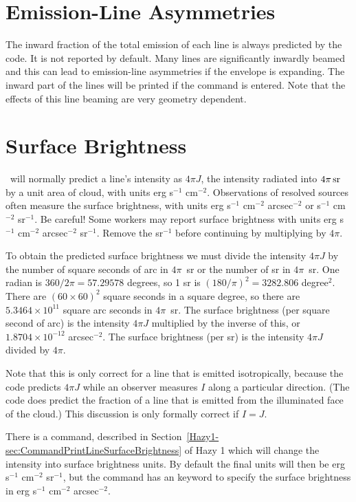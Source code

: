 \section{Emission-Line Asymmetries}

The inward fraction of the total emission of each line is always predicted
by the code.
It is not reported by default.
Many lines are significantly
inwardly beamed and this can lead to emission-line asymmetries if the
envelope is expanding.
The inward part of the lines will be printed if
the  command is entered.
Note that the effects of this line beaming
are very geometry dependent.

\section{Surface Brightness}

\Cloudy\ will normally predict a line's intensity as $4\pi J$,
the intensity
radiated into $4\pi {\rm\thinspace sr}$ by a unit area of cloud,
with units erg s$^{-1}$ cm$^{-2}$.
Observations of resolved sources often measure
the surface brightness, with
units erg s$^{-1}$ cm$^{-2}$ arcsec$^{-2}$ or
s$^{-1}$ cm$^{-2}$ sr$^{-1}$.
Be careful!  Some workers may report surface
brightness with units erg s$^{-1}$ cm$^{-2}$ arcsec$^{-2}$ sr$^{-1}$.
Remove the sr$^{-1}$ before
continuing by multiplying by $4\pi$.

To obtain the predicted surface brightness we must divide the intensity
$4\pi J$ by the number of square seconds of arc in $4\pi$~sr or the
number of sr in $4\pi$~sr.
One radian is $360/2\pi = 57.29578$ degrees,
so 1 sr is $(180/\pi)^2= 3282.806$ degree$^2$.
There are ${\left( {60 \times 60} \right)^2}$
square seconds in a square degree,
so there are $5.3464\times 10^{11}$ square arc
seconds in $4\pi$~sr.
The surface brightness (per square second of arc) is
the intensity $4\pi J$ multiplied by the inverse of this,
or $1.8704\times 10^{-12}$ arcsec$^{-2}$.
The surface brightness (per sr) is the intensity $4\pi J$ divided by $4 \pi$.

Note that this is only correct for a line that is emitted isotropically,
because the code predicts $4\pi J$ while an observer measures
$I$ along a particular direction.
(The code does predict the fraction of a line that is emitted
from the illuminated face of the cloud.)
This discussion is only formally
correct if $I = J$.

There is a
 command, 
described in 
Section~\ref{Hazy1-sec:CommandPrintLineSurfaceBrightness} 
of Hazy 1 which will change the intensity into
surface brightness units.
By default the final units will then be erg s$^{-1}$ cm$^{-2}$ sr$^{-1}$,
but the command has an  keyword to specify the surface brightness
in erg s$^{-1}$ cm$^{-2}$ arcsec$^{-2}$.

